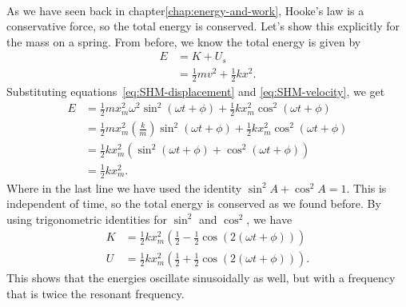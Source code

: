 \documentclass[../classical_mechanics.tex]{subfiles}
\begin{document}
        \paragraph{}
        As we have seen back in chapter\ref{chap:energy-and-work}, Hooke's law is a conservative force, so the total energy is conserved.
        Let's show this explicitly for the mass on a spring.
        From before, we know the total energy is given by
        \begin{align}
            E&=K+U_s\\
            &=\frac{1}{2}mv^2+\frac{1}{2}kx^2.
        \end{align}
        Substituting equations~\ref{eq:SHM-displacement} and \ref{eq:SHM-velocity}, we get
        \begin{align}
            E&=\frac{1}{2}mx_m^2\omega^2\sin^2(\omega t+\phi)+\frac{1}{2}kx_m^2\cos^2(\omega t+\phi)\\
            &=\frac{1}{2}mx_m^2\left(\frac{k}{m}\right)\sin^2(\omega t+\phi)+\frac{1}{2}kx_m^2\cos^2(\omega t+\phi)\\
            &=\frac{1}{2}kx_m^2\left(\sin^2(\omega t+\phi)+\cos^2(\omega t+\phi)\right)\\
            &=\frac{1}{2}kx_m^2.\label{eq:SHM-total-mech-energy}
        \end{align}
        Where in the last line we have used the identity $\sin^2A+\cos^2A=1$.
        This is independent of time, so the total energy is conserved as we found before.
        By using trigonometric identities for $\sin^2$ and $\cos^2$, we have
        \begin{align}
            K&=\frac{1}{2}kx_m^2\left(\frac{1}{2}-\frac{1}{2}\cos(2(\omega t+\phi))\right)\\
            U&=\frac{1}{2}kx_m^2\left(\frac{1}{2}+\frac{1}{2}\cos(2(\omega t+\phi))\right).
        \end{align}
        This shows that the energies oscillate sinusoidally as well, but with a frequency that is twice the resonant frequency.
\end{document}
